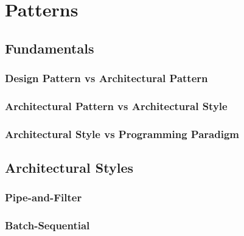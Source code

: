 \chapter{Patterns}


\section{Fundamentals}


\subsection{Design Pattern vs Architectural Pattern}


\subsection{Architectural Pattern vs Architectural Style}


\subsection{Architectural Style vs Programming Paradigm}


\section{Architectural Styles}


\subsection{Pipe-and-Filter}


\subsection{Batch-Sequential}


